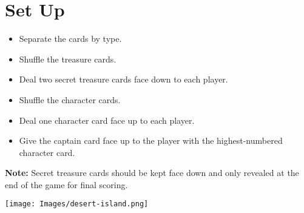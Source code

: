 \section*{Set Up}
\begin{itemize}[leftmargin=*]
\item Separate the cards by type.
\item Shuffle the treasure cards.
\item Deal two secret treasure cards face down to each player.
\item Shuffle the character cards.
\item Deal one character card face up to each player.
\item Give the captain card face up to the player with the highest-numbered character card.
\end{itemize}

\textbf{Note:} Secret treasure cards should be kept face down and only revealed at the end of the game for final scoring.

\vfill

\begin{center}
\texttt{[image: Images/desert-island.png]}
\end{center}